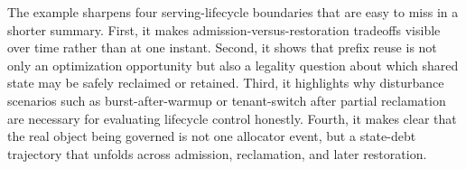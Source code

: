 The example sharpens four serving-lifecycle boundaries that are easy to miss in a shorter summary. First, it makes admission-versus-restoration tradeoffs visible over time rather than at one instant. Second, it shows that prefix reuse is not only an optimization opportunity but also a legality question about which shared state may be safely reclaimed or retained. Third, it highlights why disturbance scenarios such as burst-after-warmup or tenant-switch after partial reclamation are necessary for evaluating lifecycle control honestly. Fourth, it makes clear that the real object being governed is not one allocator event, but a state-debt trajectory that unfolds across admission, reclamation, and later restoration.
